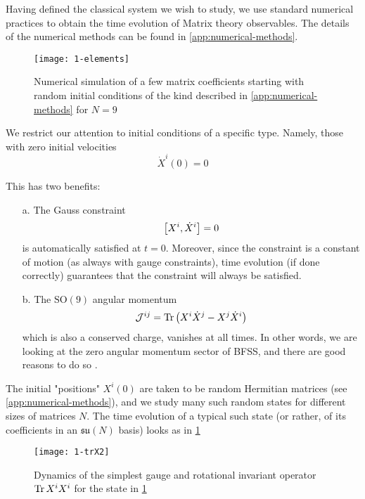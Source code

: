 Having defined the classical system we wish to study, we use standard numerical practices to obtain the time evolution of Matrix theory observables. The details of the numerical methods can be found in \cref{app:numerical-methods}.

\begin{figure}[H]
    \centering
    \texttt{[image: 1-elements]}
    \caption{Numerical simulation of a few matrix coefficients starting with random initial conditions of the kind described in \cref{app:numerical-methods} for $N = 9$}
    \label{fig:1-elements}
\end{figure}

We restrict our attention to initial conditions of a specific type. Namely, those with zero initial velocities
\begin{equation}
    \dot{X}^{i}(0) = 0
\end{equation}

This has two benefits:
\begin{enumerate}
    \item[a.] {The Gauss constraint%
    \begin{equation}
        \comm{X^i}{\dot{X}^i} = 0
    \end{equation}%
    is automatically satisfied at $t = 0$. Moreover, since the constraint is a constant of motion (as always with gauge constraints), time evolution (if done correctly) guarantees that the constraint will always be satisfied.}
    \item[b.] {The $\mathrm{SO}(9)$ angular momentum%
    \begin{equation}
        \mathcal{J}^{i j} = \Tr \left( X^{i} \dot{X}^{j} - X^{j} \dot{X}^{i} \right)
    \end{equation}%
    which is also a conserved charge, vanishes at all times. In other words, we are looking at the zero angular momentum sector of BFSS, and there are good reasons to do so \cite{Chowdhury:2015gbk}.}
\end{enumerate}

The initial "positions" $X^{i}(0)$ are taken to be random Hermitian matrices (see \cref{app:numerical-methods}), and we study many such random states for different sizes of matrices $N$. The time evolution of a typical such state (or rather, of its coefficients in an $\mathfrak{su}(N)$ basis) looks as in \cref{fig:1-elements}


\begin{figure}[H]
    \centering
    \texttt{[image: 1-trX2]}
    \caption{Dynamics of the simplest gauge and rotational invariant operator $\Tr X^i X^i$ for the state in \cref{fig:1-elements}}
    \label{fig:1-trX2}
\end{figure}


